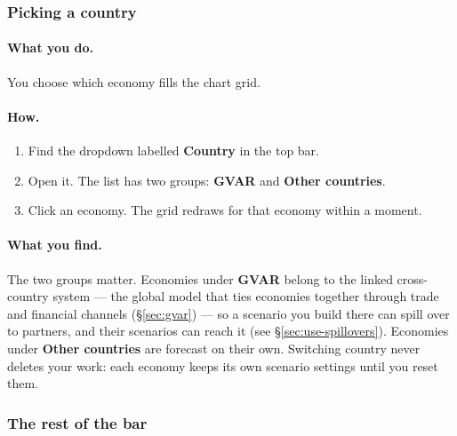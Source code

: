 \documentclass[11pt]{article}
\theoremstyle{definition}
\theoremstyle{remark}
\begin{document}
\subsubsection{Picking a country}

\paragraph{What you do.} You choose which economy fills the chart grid.

\paragraph{How.}
\begin{enumerate}
  \item Find the dropdown labelled \textbf{Country} in the top bar.
  \item Open it. The list has two groups: \textbf{GVAR} and \textbf{Other countries}.
  \item Click an economy. The grid redraws for that economy within a moment.
\end{enumerate}

\paragraph{What you find.} The two groups matter. Economies under \textbf{GVAR} belong to the
linked cross-country system --- the global model that ties economies together through trade and
financial channels (\S\ref{sec:gvar}) --- so a scenario you build there can spill over to
partners, and their scenarios can reach it (see \S\ref{sec:use-spillovers}). Economies under
\textbf{Other countries} are forecast on their own. Switching country never deletes your work:
each economy keeps its own scenario settings until you reset them.

\subsubsection{The rest of the bar}
\end{document}
